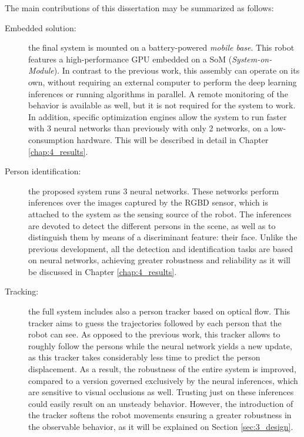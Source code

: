 The main contributions of this dissertation may be summarized as follows:
\begin{description}
	\item[Embedded solution:] the final system is mounted on a battery-powered \textit{mobile base}. This robot features a high-performance GPU embedded on a SoM (\textit{System-on-Module}). In contrast to the previous work, this assembly can operate on its own, without requiring an external computer to perform the deep learning inferences or running algorithms in parallel. A remote monitoring of the behavior is available as well, but it is not required for the system to work. In addition, specific optimization engines allow the system to run faster with 3 neural networks than previously with only 2 networks, on a low-consumption hardware. This will be described in detail in Chapter \ref{chap:4_results}.

	\item[Person identification:] the proposed system runs 3 neural networks. These networks perform inferences over the images captured by the RGBD sensor, which is attached to the system as the sensing source of the robot. The inferences are devoted to detect the different persons in the scene, as well as to distinguish them by means of a discriminant feature: their face. Unlike the previous development, all the detection and identification tasks are based on neural networks, achieving greater robustness and reliability as it will be discussed in Chapter \ref{chap:4_results}.

	\item[Tracking:] the full system includes also a person tracker based on optical flow. This tracker aims to guess the trajectories followed by each person that the robot can see. As opposed to the previous work, this tracker allows to roughly follow the persons while the neural network yields a new update, as this tracker takes considerably less time to predict the person displacement. As a result, the robustness of the entire system is improved, compared to a version governed exclusively by the neural inferences, which are sensitive to visual occlusions as well. Trusting just on these inferences could easily result on an unsteady behavior. However, the introduction of the tracker softens the robot movements ensuring a greater robustness in the observable behavior, as it will be explained on Section \ref{sec:3_design}.
\end{description}


